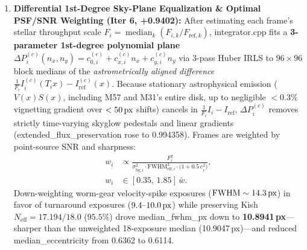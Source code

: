 \documentclass[10pt,twocolumn,letterpaper]{article}
\DeclareRobustCommand{\code}[1]{\texttt{#1}}
\def\code#1{#1}%
\def\bm#1{#1}%
\def\allowbreak{}%
\begin{document}
\begin{enumerate}
  \item \textbf{Differential 1st-Degree Sky-Plane Equalization \& Optimal PSF/SNR Weighting (\code{Iter 6}, \code{+0.9402}):}
  After estimating each frame's stellar throughput scale $F_i = \operatorname{median}_{k}(F_{i,k}/F_{\text{ref},k})$, \code{integrator.cpp} fits a \textbf{3-parameter 1st-degree polynomial plane} $\Delta P_i^{(c)}(n_x, n_y) = c_{0,i}^{(c)} + c_{x,i}^{(c)} n_x + c_{y,i}^{(c)} n_y$ via 3-pass Huber IRLS to $96\times 96$ block medians of the \emph{astrometrically aligned difference} $\frac{1}{F_i} I_i^{(c)}(\bm{T}_i\bm{x}) - I_{\text{ref}}^{(c)}(\bm{x})$. Because stationary astrophysical emission ($V(\bm{x})S(\bm{x})$, including M57 and M31's entire disk, up to negligible $<0.3\%$ vignetting gradient over $<50\text{\,px}$ shifts) cancels in $\frac{1}{F_i}I_i - I_{\text{ref}}$, $\Delta P_i^{(c)}$ removes strictly time-varying skyglow pedestals and linear gradients (\code{extended\_\allowbreak flux\_\allowbreak preservation} rose to \code{0.994358}). Frames are weighted by point-source SNR and sharpness:
  \begin{equation}
    \begin{aligned}
      w_i &\propto \frac{F_i^2}{\sigma_{\text{bg},i}^2 \cdot \text{FWHM}_{\text{eff},i}^3 \cdot \big(1 + 0.5\,e_i^2\big)}, \\
      w_i &\in [0.35,\, 1.85]\,\bar{w}.
    \end{aligned}
    \label{eq:frame_weights}
  \end{equation}
  Down-weighting worm-gear velocity-spike exposures ($\text{FWHM} \sim 14.3\text{\,px}$) in favor of turnaround exposures ($9.4\text{--}10.0\text{\,px}$) while preserving Kish $N_{\text{eff}} = 17.194 / 18.0$ ($95.5\%$) drove \code{median\_fwhm\_px} down to \textbf{\code{10.8941\,px}}---sharper than the unweighted 18-exposure median (\code{10.9047\,px})---and reduced \code{median\_eccentricity} from \code{0.6362} to \code{0.6114}.


\end{enumerate}
\end{document}
